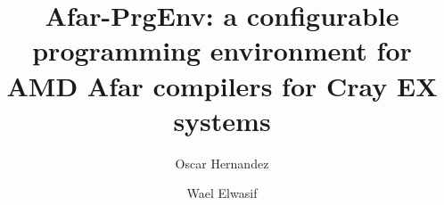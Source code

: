 \documentclass[sigconf,authordraft]{acmart}
\begin{document}
\title{Afar-PrgEnv: a configurable programming environment for AMD Afar compilers for Cray EX systems}


\author{Oscar Hernandez}

\author{Wael Elwasif}

\renewcommand{\shortauthors}{Hernandez et al.}

\begin{abstract}


\end{abstract}

\end{document}

